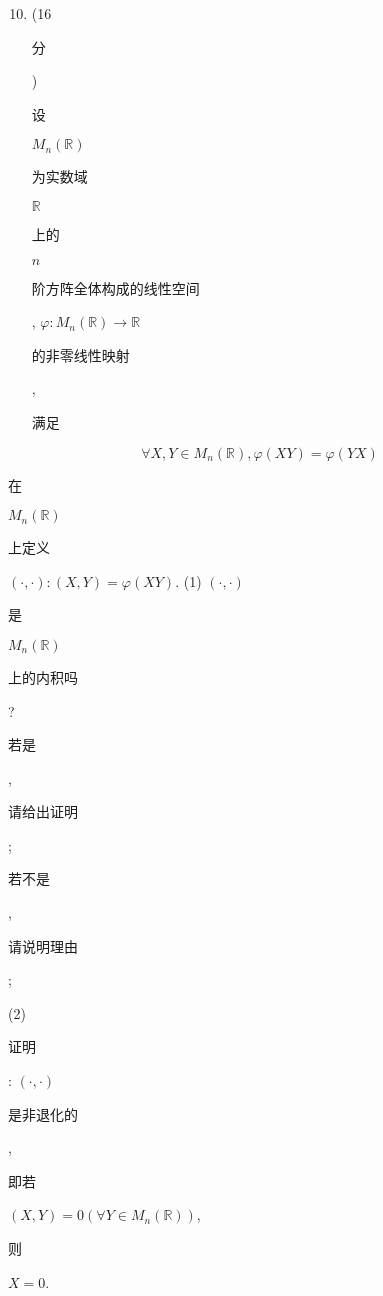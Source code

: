 \documentclass[10pt]{article}
\begin{document}
\begin{enumerate}
  \setcounter{enumi}{9}
  \item (16 \begin{CJK}{UTF8}{mj}分\end{CJK}) \begin{CJK}{UTF8}{mj}设\end{CJK} $M_{n}(\mathbb{R})$ \begin{CJK}{UTF8}{mj}为实数域\end{CJK} $\mathbb{R}$ \begin{CJK}{UTF8}{mj}上的\end{CJK} $n$ \begin{CJK}{UTF8}{mj}阶方阵全体构成的线性空间\end{CJK}, $\varphi: M_{n}(\mathbb{R}) \rightarrow \mathbb{R}$ \begin{CJK}{UTF8}{mj}的非零线性映射\end{CJK}, \begin{CJK}{UTF8}{mj}满足\end{CJK}
\end{enumerate}
$$
\forall X, Y \in M_{n}(\mathbb{R}), \varphi(X Y)=\varphi(Y X)
$$
\begin{CJK}{UTF8}{mj}在\end{CJK} $M_{n}(\mathbb{R})$ \begin{CJK}{UTF8}{mj}上定义\end{CJK} $(\cdot, \cdot):(X, Y)=\varphi(X Y)$. (1) $(\cdot, \cdot)$ \begin{CJK}{UTF8}{mj}是\end{CJK} $M_{n}(\mathbb{R})$ \begin{CJK}{UTF8}{mj}上的内积吗\end{CJK}? \begin{CJK}{UTF8}{mj}若是\end{CJK}, \begin{CJK}{UTF8}{mj}请给出证明\end{CJK}; \begin{CJK}{UTF8}{mj}若不是\end{CJK}, \begin{CJK}{UTF8}{mj}请说明理由\end{CJK};

(2) \begin{CJK}{UTF8}{mj}证明\end{CJK}: $(\cdot, \cdot)$ \begin{CJK}{UTF8}{mj}是非退化的\end{CJK}, \begin{CJK}{UTF8}{mj}即若\end{CJK} $(X, Y)=0\left(\forall Y \in M_{n}(\mathbb{R})\right)$, \begin{CJK}{UTF8}{mj}则\end{CJK} $X=0$.
\end{document}
